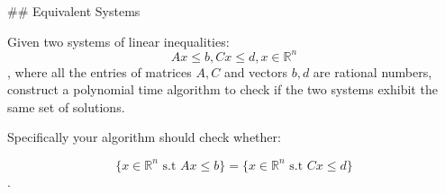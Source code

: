 ## Equivalent Systems

Given two systems of linear inequalities: $$Ax \leq b, Cx \leq d, x \in
\mathbb{R}^n$$, where all the
entries of matrices $A, C$ and vectors $b,d$ are rational numbers, construct a
polynomial time algorithm to check if the two systems exhibit the same set of
solutions.

Specifically your algorithm should check whether: 

$$\{ x \in \mathbb{R}^n \text{ s.t } Ax \leq b \} = \{x \in \mathbb{R}^n \text{ s.t } Cx \leq d \}$$. 
